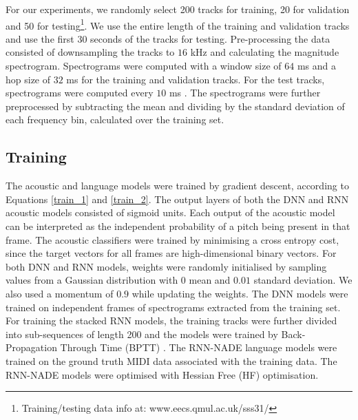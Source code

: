 \documentclass{article}
\begin{document}
\begin{table}[htbp]
\caption{Additional evaluation metrics for the hybrid architecture.}
\end{table}
For our experiments, we randomly select 200 tracks for training, 20 for validation and 50 for testing\footnote{Training/testing data info at: www.eecs.qmul.ac.uk/\texttildelow sss31/}. We use the entire length of the training and validation tracks and use the first 30 seconds of the tracks for testing. Pre-processing the data consisted of downsampling the tracks to $16$ kHz and calculating the magnitude spectrogram. Spectrograms were computed with a window size of $64$ ms and a hop size of $32$ ms for the training and validation tracks. For the test tracks, spectrograms were computed every $10$ ms \cite{bay2009evaluation}. The spectrograms were further preprocessed by subtracting the mean and dividing by the standard deviation of each frequency bin, calculated over the training set. 


\subsection{Training}


The acoustic and language models were trained by gradient descent, according to Equations \ref{train_1} and \ref{train_2}. The output layers of both the DNN and RNN acoustic models consisted of sigmoid units. Each output of the acoustic model can be interpreted as the independent probability of a pitch being present in that frame. The acoustic classifiers were trained by minimising a cross entropy cost, since the target vectors for all frames are high-dimensional binary vectors. For both DNN and RNN models, weights were randomly initialised by sampling values from a Gaussian distribution with $0$ mean and $0.01$ standard deviation. We also used a momentum of $0.9$ while updating the weights. The DNN models were trained on independent frames of spectrograms extracted from the training set. For training the stacked RNN models, the training tracks were further divided into sub-sequences of length 200 and the models were trained by Back-Propagation Through Time (BPTT) \cite{RumelhartHintonWIlliams1986}. The RNN-NADE language models were trained on the ground truth MIDI data associated with the training data. The RNN-NADE models were optimised with Hessian Free (HF) optimisation. 
\end{document}
